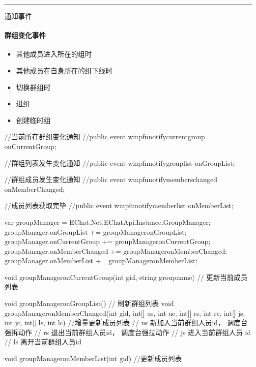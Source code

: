 \documentclass[letterpaper,10pt,english]{sphinxmanual}
\begin{document}
\bigskip\hrule\bigskip






通知事件


\paragraph{群组变化事件}
\label{\detokenize{csharp:id45}}
\begin{itemize}
\item {} 
其他成员进入所在的组时

\item {} 
其他成员在自身所在的组下线时

\item {} 
切换群组时

\end{itemize}

\begin{itemize}
\item {} 
进组

\item {} 
创建临时组

\end{itemize}

%
\begin{sphinxVerbatim}[commandchars=\\\{\}]
//当前所在群组变化通知
//public event win\PYGZus{}pfn\PYGZus{}notify\PYGZus{}current\PYGZus{}group onCurrentGroup;

//群组列表发生变化通知
//public event win\PYGZus{}pfn\PYGZus{}notify\PYGZus{}grouplist onGroupList;

//群组成员发生变化通知
//public event win\PYGZus{}pfn\PYGZus{}notify\PYGZus{}members\PYGZus{}changed onMemberChanged;

//成员列表获取完毕
//public event win\PYGZus{}pfn\PYGZus{}notify\PYGZus{}memberlist onMemberList;

var groupManager = EChat.Net.EChatApi.Instance.GroupManager;
groupManager.onGroupList += groupManager\PYGZus{}onGroupList;
groupManager.onCurrentGroup += groupManager\PYGZus{}onCurrentGroup;
groupManager.onMemberChanged += groupManager\PYGZus{}onMemberChanged;
groupManager.onMemberList += groupManager\PYGZus{}onMemberList;

void groupManager\PYGZus{}onCurrentGroup(int gid, string group\PYGZus{}name)
\PYGZob{}
    // 更新当前成员列表
\PYGZcb{}

void groupManager\PYGZus{}onGroupList()
\PYGZob{}
    // 刷新群组列表
\PYGZcb{}
void groupManager\PYGZus{}onMemberChanged(int gid, int[] us, int uc, int[] rs, int rc, int[] js, int jc, int[] ls, int lc)
\PYGZob{}
  //增量更新成员列表
  // us 新加入当前群组人员id， 调度台强拆动作
  // rs 退出当前群组人员id， 调度台强拉动作
  // js 进入当前群组人员 id
  // ls 离开当前群组人员id
\PYGZcb{}

void groupManager\PYGZus{}onMemberList(int gid)
\PYGZob{}
 //更新成员列表
\PYGZcb{}
\end{sphinxVerbatim}
\end{document}
